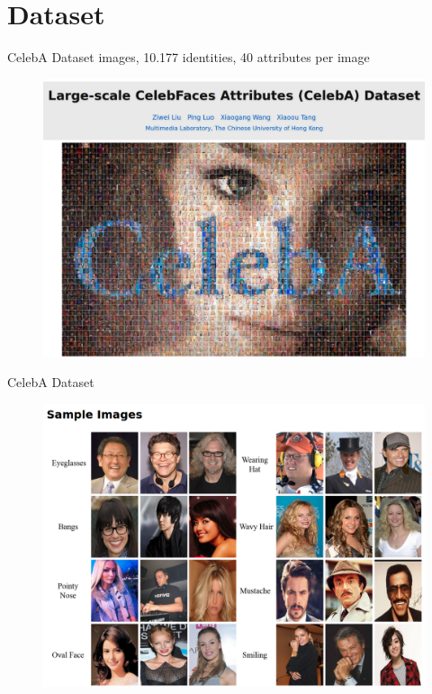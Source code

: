 \documentclass{beamer}
\begin{document}
\section{Dataset}
\begin{frame}{CelebA Dataset \cite{website}}
 images,
	10.177 identities,
	40 attributes per image 
	\begin{figure}
		\centering
		\includegraphics[width=0.9\linewidth]{figures/CelebA}
		\label{fig:celebA}
	\end{figure}
\end{frame}

\begin{frame}{CelebA Dataset}
	\begin{figure}
		\centering
		\includegraphics[width=0.9\linewidth]{figures/CelebAExamples}
		\label{fig:celebAExamples}
	\end{figure}
\end{frame}
\end{document}
